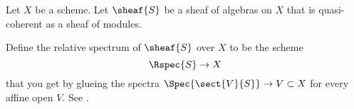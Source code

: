 \begin{definition}
Let $X$ be a scheme.
Let $\sheaf{S}$ be a sheaf of algebras on $X$
that is quasi-coherent as a sheaf of modules.

Define the relative spectrum of $\sheaf{S}$ over $X$
to be the scheme 
\[\Rspec{S} \rightarrow X\]
that you get by glueing 
the spectra $\Spec{\sect{V}{S}}\rightarrow V \subset X$ for every affine open $V$.
See \cite[Tag 01LW]{stacks-project}.
\end{definition}